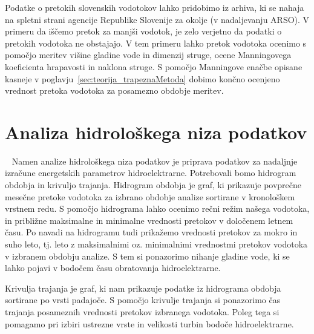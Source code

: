 
 
  Podatke o pretokih slovenskih vodotokov lahko pridobimo iz arhiva, ki se nahaja na spletni strani agencije Republike Slovenije za okolje (v nadaljevanju ARSO). V primeru da iščemo pretok za manjši vodotok, je zelo verjetno da podatki o pretokih vodotoka ne obstajajo. V tem primeru lahko pretok vodotoka ocenimo s pomočjo meritev višine gladine vode in dimenzij struge, ocene Manningovega koeficienta hrapavosti in naklona struge. S pomočjo Manningove enačbe opisane kasneje v poglavju~\ref{sec:teorija_trapeznaMetoda} dobimo končno ocenjeno vrednost pretoka vodotoka za posamezno obdobje meritev.




\section{Analiza hidrološkega niza podatkov}~\label{sec:teorija_hidrogramObdobja}
Namen analize hidrološkega niza podatkov je priprava podatkov za nadaljnje izračune energetskih parametrov hidroelektrarne. Potrebovali bomo hidrogram obdobja in krivuljo trajanja. Hidrogram obdobja je graf, ki prikazuje povprečne mesečne pretoke vodotoka za izbrano obdobje analize sortirane v kronološkem vrstnem redu. S pomočjo hidrograma lahko ocenimo rečni režim našega vodotoka, in približne maksimalne in minimalne vrednosti pretokov v določenem letnem času. Po navadi na hidrogramu tudi prikažemo vrednosti pretokov za mokro in suho leto, tj. leto z maksimalnimi oz. minimalnimi vrednostmi pretokov vodotoka v izbranem obdobju analize. S tem si ponazorimo nihanje gladine vode, ki se lahko pojavi v bodočem času obratovanja hidroelektrarne.


Krivulja trajanja je graf, ki nam prikazuje podatke iz hidrograma obdobja sortirane po vrsti padajoče. S pomočjo krivulje trajanja si ponazorimo čas trajanja posameznih vrednosti pretokov izbranega vodotoka. Poleg tega si pomagamo pri izbiri ustrezne vrste in velikosti turbin bodoče hidroelektrarne.







